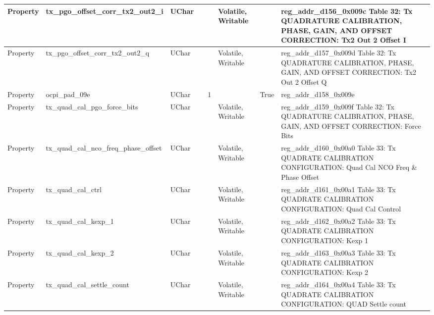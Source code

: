 \documentclass{article}
\begin{document}
\begin{scriptsize}
\begin{longtable}{|p{2cm}|p{5cm}|p{1cm}|p{2cm}|p{2cm}|p{1.75cm}|p{1.5cm}|p{5.1cm}|}
  \hline
  Property & tx\_pgo\_offset\_corr\_tx2\_out2\_i                      & UChar &                  &                  & Volatile,  Writable &         & reg\_addr\_d156\_0x009c Table 32: Tx QUADRATURE CALIBRATION, PHASE, GAIN, AND OFFSET CORRECTION: Tx2 Out 2 Offset I \\
  \hline
  Property & tx\_pgo\_offset\_corr\_tx2\_out2\_q                      & UChar &                  &                  & Volatile,  Writable &         & reg\_addr\_d157\_0x009d Table 32: Tx QUADRATURE CALIBRATION, PHASE, GAIN, AND OFFSET CORRECTION: Tx2 Out 2 Offset Q \\
  \hline
  Property & ocpi\_pad\_09e                                           & UChar &                  & 1                &                     & True    & reg\_addr\_d158\_0x009e \\
  \hline
  Property & tx\_quad\_cal\_pgo\_force\_bits                          & UChar &                  &                  & Volatile,  Writable &         & reg\_addr\_d159\_0x009f Table 32: Tx QUADRATURE CALIBRATION, PHASE, GAIN, AND OFFSET CORRECTION: Force Bits \\
  \hline
  Property & tx\_quad\_cal\_nco\_freq\_phase\_offset                  & UChar &                  &                  & Volatile,  Writable &         & reg\_addr\_d160\_0x00a0 Table 33: Tx QUADRATE CALIBRATION CONFIGURATION: Quad Cal NCO Freq \& Phase Offset \\
  \hline
  Property & tx\_quad\_cal\_ctrl                                      & UChar &                  &                  & Volatile,  Writable &         & reg\_addr\_d161\_0x00a1 Table 33: Tx QUADRATE CALIBRATION CONFIGURATION: Quad Cal Control \\
  \hline
  Property & tx\_quad\_cal\_kexp\_1                                   & UChar &                  &                  & Volatile,  Writable &         & reg\_addr\_d162\_0x00a2 Table 33: Tx QUADRATE CALIBRATION CONFIGURATION: Kexp 1 \\
  \hline
  Property & tx\_quad\_cal\_kexp\_2                                   & UChar &                  &                  & Volatile,  Writable &         & reg\_addr\_d163\_0x00a3 Table 33: Tx QUADRATE CALIBRATION CONFIGURATION: Kexp 2 \\
  \hline
  Property & tx\_quad\_cal\_settle\_count                             & UChar &                  &                  & Volatile,  Writable &         & reg\_addr\_d164\_0x00a4 Table 33: Tx QUADRATE CALIBRATION CONFIGURATION: QUAD Settle count \\

\end{longtable}
\end{scriptsize}
\end{document}
